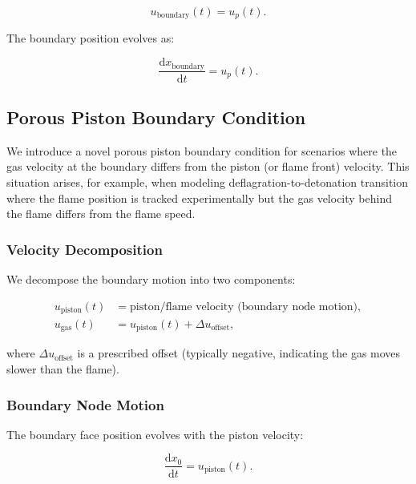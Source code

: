 \documentclass[12pt,a4paper]{article}
\newcommand{\dd}{\mathrm{d}}
\begin{document}
\begin{equation}
    u_{\text{boundary}}(t) = u_p(t).
    \label{eq:moving_piston}
\end{equation}

The boundary position evolves as:

\begin{equation}
    \frac{\dd x_{\text{boundary}}}{\dd t} = u_p(t).
    \label{eq:piston_position}
\end{equation}

\subsection{Porous Piston Boundary Condition}

We introduce a novel porous piston boundary condition for scenarios where the gas velocity at the boundary differs from the piston (or flame front) velocity. This situation arises, for example, when modeling deflagration-to-detonation transition where the flame position is tracked experimentally but the gas velocity behind the flame differs from the flame speed.

\subsubsection{Velocity Decomposition}

We decompose the boundary motion into two components:

\begin{align}
    u_{\text{piston}}(t) &= \text{piston/flame velocity (boundary node motion)}, \\
    u_{\text{gas}}(t) &= u_{\text{piston}}(t) + \Delta u_{\text{offset}},
\end{align}

\noindent where $\Delta u_{\text{offset}}$ is a prescribed offset (typically negative, indicating the gas moves slower than the flame).

\subsubsection{Boundary Node Motion}

The boundary face position evolves with the piston velocity:

\begin{equation}
    \frac{\dd x_0}{\dd t} = u_{\text{piston}}(t).
    \label{eq:porous_position}
\end{equation}
\end{document}
